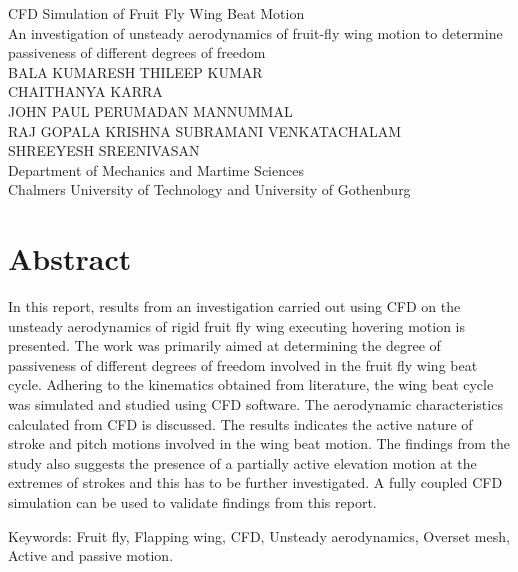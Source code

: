 {CFD Simulation of Fruit Fly Wing Beat Motion}\\
{An investigation of unsteady aerodynamics of fruit-fly wing motion to determine passiveness of different degrees of freedom}\\

{BALA KUMARESH THILEEP KUMAR\\         [0.2cm]
        CHAITHANYA KARRA\\[0.2cm]
        JOHN PAUL PERUMADAN MANNUMMAL\\[0.2cm]
        RAJ GOPALA KRISHNA SUBRAMANI VENKATACHALAM\\[0.2cm]
        SHREEYESH SREENIVASAN}\\
        
Department of Mechanics and Martime Sciences\\
Chalmers University of Technology and University of Gothenburg\setlength{\parskip}{0.5cm}

\thispagestyle{plain}			%
\setlength{\parskip}{0pt plus 1.0pt}
\section*{Abstract}
In this report, results from an investigation carried out using CFD on the unsteady aerodynamics of rigid fruit fly wing executing hovering motion is presented. The work was primarily aimed at determining the degree of passiveness of different degrees of freedom involved in the fruit fly wing beat cycle. Adhering to the kinematics obtained from literature, the wing beat cycle was simulated and studied using CFD software. The aerodynamic characteristics calculated from CFD is discussed. The results indicates the active nature of stroke and pitch motions involved in the wing beat motion. The findings from the study also suggests the presence of a partially active elevation motion at the extremes of strokes and this has to be further investigated. A fully coupled CFD simulation can be used to validate findings from this report.

\vfill
Keywords: Fruit fly, Flapping wing, CFD, Unsteady aerodynamics, Overset mesh, Active and passive motion.

\newpage				%
\thispagestyle{empty}
\mbox{}